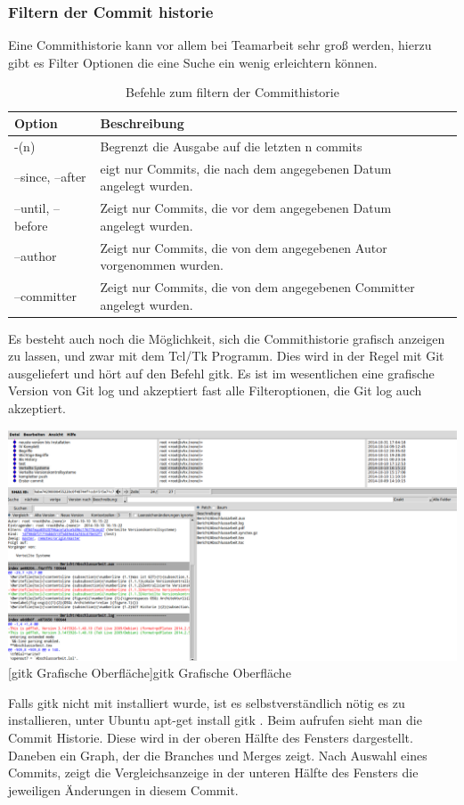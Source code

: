 \documentclass[12pt,a4paper,bibliography=totocnumbered,listof=totocnumbered]{scrartcl}
\begin{document}
\subsubsection{Filtern der Commit historie}
Eine Commithistorie kann vor allem bei Teamarbeit sehr groß werden, hierzu gibt es Filter Optionen die eine Suche ein wenig erleichtern können. 
 \vspace{1em}
\begin{table}[!h]
	\centering
	\begin{tabular}{|l|l|l|}
		\hline
		\textbf{Option} & \textbf{Beschreibung} \\
		\hline
		-(n)& Begrenzt die Ausgabe auf die letzten n commits\\
		\hline
		--since, --after & eigt nur Commits, die nach dem angegebenen Datum angelegt wurden.\\
		\hline
		--until, --before & Zeigt nur Commits, die vor dem angegebenen Datum angelegt wurden.\\
		\hline
		--author & Zeigt nur Commits, die von dem angegebenen Autor vorgenommen wurden.\\
		\hline
		--committer & Zeigt nur Commits, die von dem angegebenen Committer angelegt wurden.\\
		\hline
	\end{tabular}
	\caption{Befehle zum filtern der Commithistorie}
	\label{tab:Befehle}
\end{table}

Es besteht auch noch die Möglichkeit, sich die Commithistorie grafisch anzeigen zu lassen, und zwar mit dem Tcl/Tk Programm.
Dies wird in der Regel mit Git ausgeliefert und hört auf den Befehl gitk. Es ist im wesentlichen eine grafische Version von Git log und akzeptiert fast alle Filteroptionen, die Git log auch akzeptiert.

\vspace{3pt}
\begin{minipage}{\linewidth}
	\centering
	\includegraphics[width=0.9\linewidth]{Bilder/gitk.png}
	[gitk Grafische Oberfläche]{gitk Grafische Oberfläche}
	\label{fig:osgi}
\end{minipage}
Falls gitk nicht mit installiert wurde, ist es selbstverständlich nötig es zu installieren, unter Ubuntu apt-get install gitk .
Beim aufrufen sieht man die Commit Historie. Diese wird in der oberen Hälfte des Fensters dargestellt. Daneben ein Graph, der die Branches und Merges zeigt. Nach Auswahl eines Commits, zeigt die Vergleichsanzeige in der unteren Hälfte des Fensters die jeweiligen Änderungen in diesem Commit.
\newpage
\end{document}
